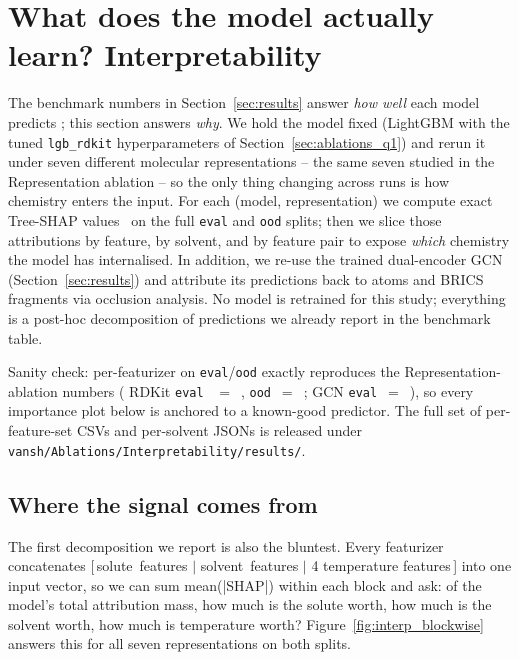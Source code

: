 \section{What does the model actually learn?  Interpretability}
\label{sec:interpretability}

The benchmark numbers in Section~\ref{sec:results} answer \emph{how
well} each model predicts \logS{}; this section answers \emph{why}.
We hold the model fixed (LightGBM with the tuned \texttt{lgb\_rdkit}
hyperparameters of Section~\ref{sec:ablations_q1}) and rerun it under
seven different molecular representations -- the same seven studied in
the Representation ablation -- so the only thing changing across runs
is how chemistry enters the input.  For each (model, representation)
we compute exact Tree-SHAP values~\cite{lundberg2018consistent} on the
full \texttt{eval} and \texttt{ood} splits; then we slice those
attributions by feature, by solvent, and by feature pair to expose
\emph{which} chemistry the model has internalised.  In addition, we
re-use the trained dual-encoder GCN (Section~\ref{sec:results}) and
attribute its predictions back to atoms and BRICS fragments via
occlusion analysis.  No model is retrained for this study; everything
is a post-hoc decomposition of predictions we already report in the
benchmark table.

Sanity check: per-featurizer \RMSE{} on \texttt{eval}/\texttt{ood}
exactly reproduces the Representation-ablation numbers (\eg{} RDKit
\texttt{eval} \RMSE{}~$=$~, \texttt{ood}~$=$~;
GCN \texttt{eval}~$=$~), so every importance plot below
is anchored to a known-good predictor.  The full set of
per-feature-set CSVs and per-solvent JSONs is released under
\texttt{vansh/Ablations/Interpretability/results/}.

\subsection{Where the signal comes from}
\label{sec:interp_blockwise}

The first decomposition we report is also the bluntest.  Every
featurizer concatenates [\,solute~features\,$\,|\,$\,solvent~features\,$\,|\,$\,4 temperature features\,]
into one input vector, so we can sum mean(|SHAP|) within each block and
ask: of the model's total attribution mass, how much is the solute
worth, how much is the solvent worth, how much is temperature worth?
Figure~\ref{fig:interp_blockwise} answers this for all seven
representations on both splits.

